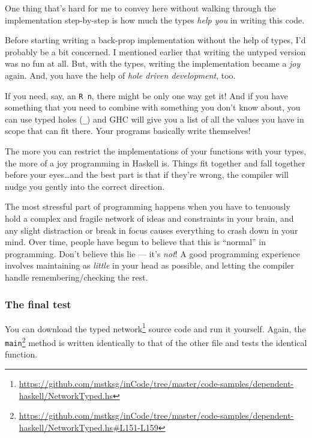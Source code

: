 \documentclass[]{article}
\renewcommand{\href}[2]{#2\footnote{\url{#1}}}
\begin{document}
One thing that's hard for me to convey here without walking through the
implementation step-by-step is how much the types \emph{help you} in writing
this code.

Before starting writing a back-prop implementation without the help of types,
I'd probably be a bit concerned. I mentioned earlier that writing the untyped
version was no fun at all. But, with the types, writing the implementation
became a \emph{joy} again. And, you have the help of \emph{hole driven
development}, too.

If you need, say, an \texttt{R\ n}, there might be only one way get it! And if
you have something that you need to combine with something you don't know about,
you can use typed holes (\texttt{\_}) and GHC will give you a list of all the
values you have in scope that can fit there. Your programs basically write
themselves!

The more you can restrict the implementations of your functions with your types,
the more of a joy programming in Haskell is. Things fit together and fall
together before your eyes\ldots and the best part is that if they're wrong, the
compiler will nudge you gently into the correct direction.

The most stressful part of programming happens when you have to tenuously hold a
complex and fragile network of ideas and constraints in your brain, and any
slight distraction or break in focus causes everything to crash down in your
mind. Over time, people have begun to believe that this is ``normal'' in
programming. Don't believe this lie --- it's \emph{not}! A good programming
experience involves maintaining as \emph{little} in your head as possible, and
letting the compiler handle remembering/checking the rest.

\hypertarget{the-final-test}{%
\subsubsection{The final test}\label{the-final-test}}

You can download the
\href{https://github.com/mstksg/inCode/tree/master/code-samples/dependent-haskell/NetworkTyped.hs}{typed
network} source code and run it yourself. Again, the
\href{https://github.com/mstksg/inCode/tree/master/code-samples/dependent-haskell/NetworkTyped.hs\#L151-L159}{\texttt{main}}
method is written identically to that of the other file and tests the identical
function.
\end{document}
